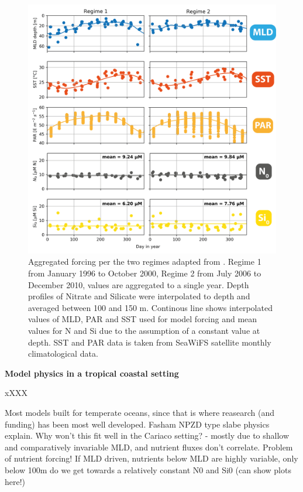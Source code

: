 \begin{figure}
\centering
\includegraphics[trim = 0mm 0mm 0mm 0mm, clip, width=1.\linewidth]{./Chp2-Pre/ForcingAsset411.png}
\caption[Scheme]{\small {Aggregated forcing per the two regimes adapted from \citet{Pinckney2015}. Regime 1 from January 1996 to October 2000, Regime 2 from July 2006 to December 2010, values are aggregated to a single year. Depth profiles of Nitrate and Silicate were interpolated to depth and averaged between 100 and 150 m. Continous line shows interpolated values of MLD, PAR and SST used for model forcing and mean values for N and Si due to the assumption of a constant value at depth. SST and PAR data is taken from SeaWiFS satellite monthly climatological data. }}
\label{ModelForcing}
\end{figure}

\small {\textbf{Model physics in a tropical coastal setting}}

xXXX

Most models built for temperate oceans, since that is where reasearch (and funding) has been most well developed. Fasham NPZD type slabe physics explain.
Why won't this fit well in the Cariaco setting? - mostly due to shallow and comparatively invariable MLD, and nutrient fluxes don't correlate.
Problem of nutrient forcing! If MLD driven, nutrients below MLD are highly variable, only below 100m do we get towards a relatively constant N0 and Si0 (can show plots here!)


